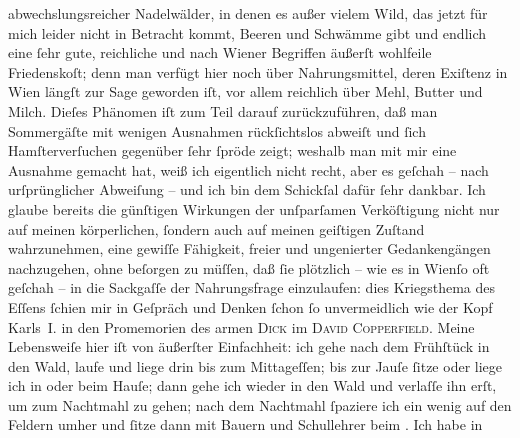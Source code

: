 \begin{ledgroupsized}[t]{13cm}
               abwechslungsreicher Nadelwälder, in denen es außer vielem Wild, das jetzt für mich
               leider nicht in Betracht kommt, Beeren und Schwämme gibt und endlich eine ſehr gute,
               reichliche und nach Wiener Begriffen äußerſt
               wohlfeile Friedenskoſt; denn man verfügt hier noch über Nahrungsmittel, deren
               Exiſtenz in Wien längſt zur Sage geworden iſt, vor
               allem reichlich über Mehl, Butter und Milch. Dieſes Phänomen iſt zum Teil darauf
               zurückzuführen, daß man Sommergäſte mit wenigen Ausnahmen rückſichtslos abweiſt und
               ſich Hamſterverſuchen gegenüber ſehr ſpröde zeigt; weshalb man mit mir eine Ausnahme
               gemacht hat, weiß ich eigentlich nicht recht, aber es geſchah – nach urſprünglicher
               Abweiſung – und ich bin dem Schickſal dafür ſehr dankbar. Ich glaube bereits die
               günſtigen Wirkungen der unſparſamen {\pb}Verköſtigung nicht nur auf meinen körperlichen, ſondern auch auf meinen geiſtigen
               Zuſtand wahrzunehmen, eine gewiſſe Fähigkeit, freier und ungenierter Gedankengängen
               nachzugehen, ohne beſorgen zu müſſen, daß ſie plötzlich – wie es in Wienſo oft geſchah – in die Sackgaſſe der Nahrungsfrage
               einzulaufen: dies Kriegsthema des Eſſens ſchien mir in Geſpräch und Denken ſchon ſo
               unvermeidlich wie der Kopf Karls I. in den Promemorien des armen \textsc{Dick} im \textsc{David Copperfield}.\pend
           \pstart
           Meine Lebensweiſe hier iſt von äußerſter Einfachheit: ich gehe nach dem Frühſtück in
               den Wald, laufe und liege drin bis zum Mittageſſen; bis zur Jauſe ſitze oder liege
               ich in oder beim Hauſe; dann gehe ich wieder in den Wald und verlaſſe ihn erſt, um
               zum Nachtmahl zu gehen; nach dem Nachtmahl ſpaziere ich ein wenig auf den Feldern
               umher und ſitze dann mit Bauern und Schul{\pb}lehrer beim \label{K_L02289_1v}\label{K_L02289_1h}. Ich habe in

\end{ledgroupsized}

